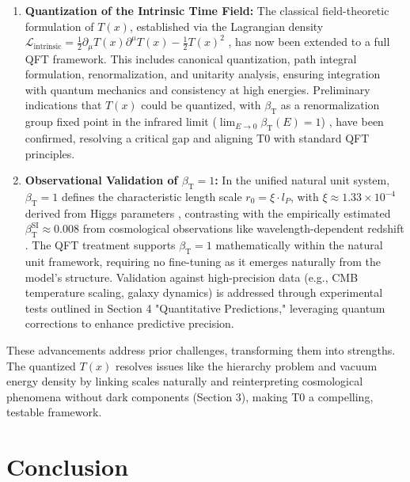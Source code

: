 \documentclass[twocolumn,aps,prl]{revtex4-2}
\newcommand{\Tfield}{T(x)}
\newcommand{\betaT}{\beta_{\text{T}}}
\newcommand{\calL}{\mathcal{L}}
\begin{document}
	\begin{enumerate}
		\item \textbf{Quantization of the Intrinsic Time Field:} The classical field-theoretic formulation of \(\Tfield\), established via the Lagrangian density \(\calL_{\text{intrinsic}} = \frac{1}{2}\partial_{\mu}\Tfield\partial^{\mu}\Tfield - \frac{1}{2}\Tfield^2\) \cite{pascher_lagrange_2025}, has now been extended to a full QFT framework. This includes canonical quantization, path integral formulation, renormalization, and unitarity analysis, ensuring integration with quantum mechanics and consistency at high energies. Preliminary indications that \(\Tfield\) could be quantized, with \(\betaT\) as a renormalization group fixed point in the infrared limit (\(\lim_{E \to 0} \betaT(E) = 1\)) \cite{pascher_alphabeta_2025}, have been confirmed, resolving a critical gap and aligning T0 with standard QFT principles.
		
		\item \textbf{Observational Validation of \(\betaT = 1\):} In the unified natural unit system, \(\betaT = 1\) defines the characteristic length scale \(r_0 = \xi \cdot l_P\), with \(\xi \approx 1.33 \times 10^{-4}\) derived from Higgs parameters \cite{pascher_params_2025, pascher_alphabeta_2025}, contrasting with the empirically estimated \(\betaT^{\text{SI}} \approx 0.008\) from cosmological observations like wavelength-dependent redshift \cite{pascher_messdifferenzen_2025}. The QFT treatment supports \(\betaT = 1\) mathematically within the natural unit framework, requiring no fine-tuning as it emerges naturally from the model’s structure. Validation against high-precision data (e.g., CMB temperature scaling, galaxy dynamics) is addressed through experimental tests outlined in Section 4 "Quantitative Predictions," leveraging quantum corrections to enhance predictive precision.
	\end{enumerate}
	
	These advancements address prior challenges, transforming them into strengths. The quantized \(\Tfield\) resolves issues like the hierarchy problem and vacuum energy density by linking scales naturally and reinterpreting cosmological phenomena without dark components (Section 3), making T0 a compelling, testable framework.
	
	\section{Conclusion}
	\label{sec:conclusion}
	
\end{document}
